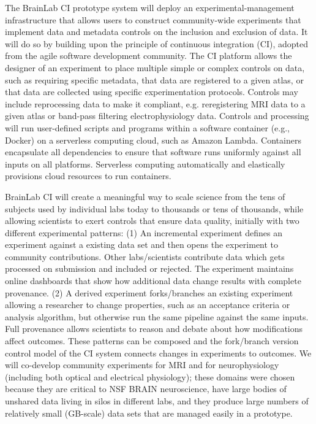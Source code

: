 
The BrainLab CI prototype system will deploy an experimental-management infrastructure that allows users to construct community-wide experiments that implement data and metadata controls on the inclusion and exclusion of data. It will do so by building upon the principle of continuous integration (CI), adopted from the agile software development community. The CI platform allows the designer of an experiment to place multiple simple or complex controls on data, such as requiring specific metadata, that data are registered to a given atlas, or that data are collected using specific experimentation protocols. Controls may include reprocessing data to make it compliant, e.g. reregistering MRI data to a given atlas or band-pass filtering electrophysiology data. Controls and processing will run user-defined scripts and programs within a software container (e.g., Docker) on a serverless computing cloud, such as Amazon Lambda. Containers encapsulate all dependencies to ensure that software runs uniformly against all inputs on all platforms. Serverless computing automatically and elastically provisions cloud resources to run containers.

BrainLab CI will create a meaningful way to scale science from the tens of subjects used by individual labs today to thousands or tens of thousands, while allowing scientists to exert controls that ensure data quality, initially with two different experimental patterns: (1) An incremental experiment defines an experiment against a existing data set and then opens the experiment to community contributions. Other labs/scientists contribute data which gets processed on submission and included or rejected. The experiment maintains online dashboards that show how additional data change results with complete provenance. (2) A derived experiment forks/branches an existing experiment allowing a researcher to change properties, such as an acceptance criteria or analysis algorithm, but otherwise run the same pipeline against the same inputs. Full provenance allows scientists to reason and debate about how modifications affect outcomes. These patterns can be composed and the fork/branch version control model of the CI system connects changes in experiments to outcomes. We will co-develop community experiments for MRI and for neurophysiology (including both optical and electrical physiology); these domains were chosen because they are critical to NSF BRAIN neuroscience, have large bodies of unshared data living in silos in different labs, and they produce large numbers of relatively small (GB-scale) data sets that are managed easily in a prototype.

